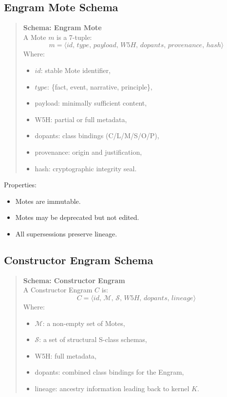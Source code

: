 \subsection{Engram Mote Schema}
\label{schema:Engram_Mote}

\begin{quote}
\textbf{Schema: Engram Mote}\\
A Mote $m$ is a 7-tuple:
\[
    m = \langle id,\, type,\, payload,\, W5H,\, dopants,\, provenance,\, hash \rangle
\]
Where:
\begin{itemize}
    \item $id$: stable Mote identifier,
    \item $type$: \{fact, event, narrative, principle\},
    \item payload: minimally sufficient content,
    \item W5H: partial or full metadata,
    \item dopants: class bindings (C/L/M/S/O/P),
    \item provenance: origin and justification,
    \item hash: cryptographic integrity seal.
\end{itemize}
\end{quote}

Properties:
\begin{itemize}
    \item Motes are immutable.
    \item Motes may be deprecated but not edited.
    \item All supersessions preserve lineage.
\end{itemize}

\subsection{Constructor Engram Schema}
\label{schema:Constructor_Engram}

\begin{quote}
\textbf{Schema: Constructor Engram}\\
A Constructor Engram $C$ is:
\[
    C = \langle id,\, \mathcal{M},\, \mathcal{S},\, W5H,\, dopants,\, lineage \rangle
\]
Where:
\begin{itemize}
    \item $\mathcal{M}$: a non-empty set of Motes,
    \item $\mathcal{S}$: a set of structural S-class schemas,
    \item W5H: full metadata,
    \item dopants: combined class bindings for the Engram,
    \item lineage: ancestry information leading back to kernel $K$.
\end{itemize}
\end{quote}

